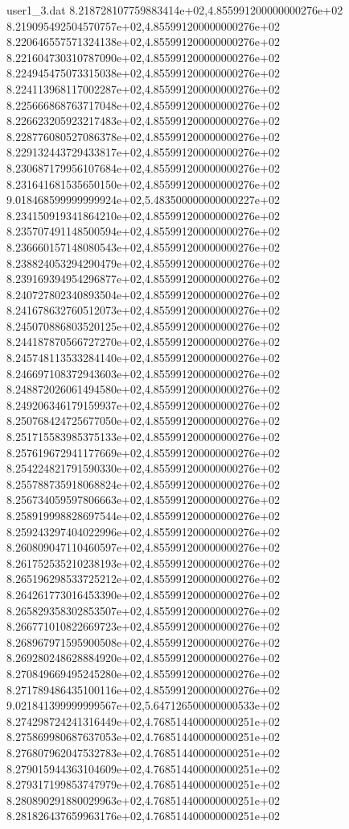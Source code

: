 \begin{filecontents}{user1_3.dat}
8.218728107759883414e+02,4.855991200000000276e+02
8.219095492504570757e+02,4.855991200000000276e+02
8.220646557571324138e+02,4.855991200000000276e+02
8.221604730310787090e+02,4.855991200000000276e+02
8.224945475073315038e+02,4.855991200000000276e+02
8.224113968117002287e+02,4.855991200000000276e+02
8.225666868763717048e+02,4.855991200000000276e+02
8.226623205923217483e+02,4.855991200000000276e+02
8.228776080527086378e+02,4.855991200000000276e+02
8.229132443729433817e+02,4.855991200000000276e+02
8.230687179956107684e+02,4.855991200000000276e+02
8.231641681535650150e+02,4.855991200000000276e+02
9.018468599999999924e+02,5.483500000000000227e+02
8.234150919341864210e+02,4.855991200000000276e+02
8.235707491148500594e+02,4.855991200000000276e+02
8.236660157148080543e+02,4.855991200000000276e+02
8.238824053294290479e+02,4.855991200000000276e+02
8.239169394954296877e+02,4.855991200000000276e+02
8.240727802340893504e+02,4.855991200000000276e+02
8.241678632760512073e+02,4.855991200000000276e+02
8.245070886803520125e+02,4.855991200000000276e+02
8.244187870566727270e+02,4.855991200000000276e+02
8.245748113533284140e+02,4.855991200000000276e+02
8.246697108372943603e+02,4.855991200000000276e+02
8.248872026061494580e+02,4.855991200000000276e+02
8.249206346179159937e+02,4.855991200000000276e+02
8.250768424725677050e+02,4.855991200000000276e+02
8.251715583985375133e+02,4.855991200000000276e+02
8.257619672941177669e+02,4.855991200000000276e+02
8.254224821791590330e+02,4.855991200000000276e+02
8.255788735918068824e+02,4.855991200000000276e+02
8.256734059597806663e+02,4.855991200000000276e+02
8.258919998828697544e+02,4.855991200000000276e+02
8.259243297404022996e+02,4.855991200000000276e+02
8.260809047110460597e+02,4.855991200000000276e+02
8.261752535210238193e+02,4.855991200000000276e+02
8.265196298533725212e+02,4.855991200000000276e+02
8.264261773016453390e+02,4.855991200000000276e+02
8.265829358302853507e+02,4.855991200000000276e+02
8.266771010822669723e+02,4.855991200000000276e+02
8.268967971595900508e+02,4.855991200000000276e+02
8.269280248628884920e+02,4.855991200000000276e+02
8.270849669495245280e+02,4.855991200000000276e+02
8.271789486435100116e+02,4.855991200000000276e+02
9.021841399999999567e+02,5.647126500000000533e+02
8.274298724241316449e+02,4.768514400000000251e+02
8.275869980687637053e+02,4.768514400000000251e+02
8.276807962047532783e+02,4.768514400000000251e+02
8.279015944363104609e+02,4.768514400000000251e+02
8.279317199853747979e+02,4.768514400000000251e+02
8.280890291880029963e+02,4.768514400000000251e+02
8.281826437659963176e+02,4.768514400000000251e+02

\end{filecontents}
